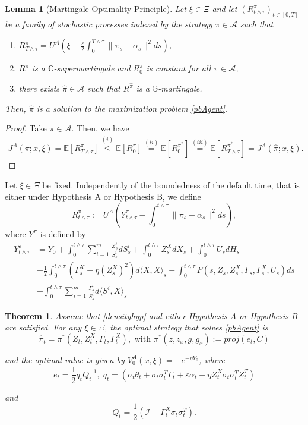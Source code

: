 \documentclass[11pt,a4paper]{article}
\theoremstyle{thmstyleone}%
\newtheorem{theorem}{Theorem}%
\theoremstyle{thmstyletwo}%
\theoremstyle{thmstylethree}%
\newtheorem{lemma}{Lemma}%
\newcommand{\E}{\mathbb{E}}
\newcommand{\G}{\mathbb{G}}
\newcommand{\T}{T \wedge \tau}
\begin{document}
\begin{lemma}[Martingale Optimality Principle] \label{theorem:MOP}
    Let $\xi\in \Xi$ and let $(R^{\pi}_{t\wedge \tau})_{t \in [0, T]}$ be a family of stochastic processes indexed by the strategy $\pi \in \mathcal A$ such that
    \begin{enumerate}
        \item[(i)] $R^{\pi}_{T\wedge \tau} = U^A(\xi- \frac{\varepsilon}2\int_{0}^{\T} \|\pi_s - \alpha_s\|^2 ds)$,
        \item[(ii)] $R^{\pi}$ is a $\G$-supermartingale and $R^{\pi}_0 $ is constant for all $\pi \in \mathcal A$,
        \item[(iii)] there exists $\hat\pi\in \mathcal A$ such that $R^{\hat\pi}$ is a $\G$-martingale.
    \end{enumerate}
    Then, $\hat\pi$ is a solution to the maximization problem \eqref{pbAgent}.
\end{lemma}
\begin{proof}
    Take $\pi \in \mathcal A$. Then, we have
    \begin{align*}
       J^A(\pi;x,\xi) = \E[R^{\pi}_{\T}] \overset{(i)}\leq \E[R^{\pi}_0]\overset{(ii)}  =  \E[R^{\pi^*}_0] \overset{(iii)} =  \E[R^{\pi^*}_{\T}] = J^A(\hat\pi;x,\xi).
    \end{align*}\end{proof}
Let $\xi\in\Xi$ be fixed. 
Independently of the boundedness of the default time, that is either under Hypothesis A or Hypothesis B, we define
\[ R^{\pi}_{t\wedge \tau} := U^A(Y^\pi_{t\wedge\tau} - \int_0^{t\wedge\tau} \|\pi_s - \alpha_s\|^2 ds),\]
   where $Y^\pi$ is defined by
\begin{align*} \label{eq:BSDE}
    Y^\pi_{t \wedge \tau} &=Y_0+ \int_{0}^{t \wedge \tau} \sum_{i=1}^m \frac{Z^i_s}{S^i_s} dS^i_s + \int_0^{t \wedge \tau} Z_s^X dX_s + \int_{0}^{t \wedge \tau} U_s dH_s \\
    &+ \frac{1}{2}\int_0^{t \wedge \tau} (\Gamma_s^X + \eta (Z_s^X)^2 ) d\langle X, X\rangle_s - \int_0^{t \wedge \tau} F(s, Z_s, Z_s^X, \Gamma_s, \Gamma_s^X,U_s) ds\\
    &+\int_0^{t \wedge \tau} \sum_{i=1}^m \frac{\Gamma^i_s}{S^i_s} d\langle S^i, X\rangle_s
\end{align*}


\begin{theorem}\label{thm:value}
    Assume that \ref{densityhyp} and either Hypothesis A or Hypothesis B are satisfied. For any $\xi\in \Xi$, the optimal strategy that solves \eqref{pbAgent} is 
  \begin{equation}\label{eq:optStrat}
        \hat\pi_t =\pi^*(Z_t, Z_t^X, \Gamma_t, \Gamma^X_t),\text{ with }\pi^*(z,z_x,g,g_x):= proj(e_t, C) \end{equation}

    and the optimal value is given by 
        $V^A_0(x,\xi) = -e^{-\eta Y_0}$, where
    \[
        e_t = \frac{1}{2}q_t Q_t^{-1},\; q_t = (\sigma_t \theta_t + \sigma_t \sigma^T_t \Gamma_t + \varepsilon\alpha_t - \eta Z_t^X  \sigma_t \sigma^T_t Z^T_t)
    \]

    and
    \[
        Q_t = \frac{1}{2}(\mathcal{I} - \Gamma^X_t \sigma_t \sigma^T_t ).
    \]
\end{theorem}
\end{document}
